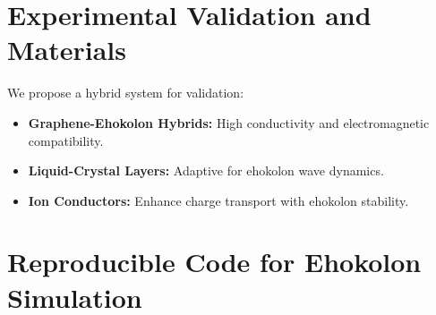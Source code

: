 \documentclass{article}
\begin{document}
\section{Experimental Validation and Materials}
We propose a hybrid system for validation:
\begin{itemize}
    \item \textbf{Graphene-Ehokolon Hybrids:} High conductivity and electromagnetic compatibility.
    \item \textbf{Liquid-Crystal Layers:} Adaptive for ehokolon wave dynamics.
    \item \textbf{Ion Conductors:} Enhance charge transport with ehokolon stability.
\end{itemize}

\section{Reproducible Code for Ehokolon Simulation}
\end{document}
